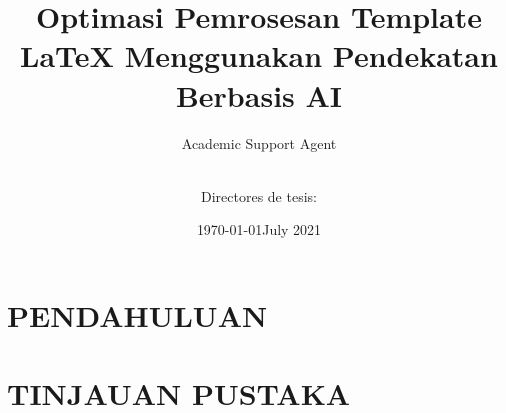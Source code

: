 \documentclass{book}
\title{Optimasi Pemrosesan Template LaTeX Menggunakan Pendekatan Berbasis AI}
\author{Academic Support Agent}
\date{\today}
\begin{document}
\maketitle

\begin{abstract}

\end{abstract}

\chapter{PENDAHULUAN}


\chapter{TINJAUAN PUSTAKA}


\usepackage[utf8]{inputenc}
\usepackage[spanish]{babel}
\usepackage[width=16cm,height=21cm]{geometry}
\usepackage{fancyhdr}
\usepackage[square,numbers]{natbib}
\usepackage[nottoc,numbib]{tocbibind}
\pagestyle{fancy}
\setlength{\headheight}{20pt}
\linespread{1.1}
\fancyhead[E]{\thepage\hfill \textit{\nouppercase{\rightmark}}}
\fancyhead[O]{\textit{\nouppercase{\leftmark}}\hfill\thepage}
\renewcommand{\headrulewidth}{0.5pt}
\cfoot{}
\usepackage{amsmath,amssymb,mathtools}
\usepackage{url}
\usepackage{tikz}
\usetikzlibrary{shapes.geometric}
\newcommand{\bD}{\mathbb{D}}
\newcommand{\bR}{\mathbb{R}}
\newcommand{\bZ}{\mathbb{Z}}
\newcommand{\bC}{\mathbb{C}}
\newcommand{\bN}{\mathbb{N}}
\newcommand{\cH}{\mathcal{H}}
\newcommand{\cA}{\mathcal{A}}
\renewcommand{\phi}{\varphi}
\newcommand{\arctanh}{\operatorname{arctanh}}
\newcommand{\sinc}{\operatorname{sinc}}
\newcommand{\eqdef}{\coloneqq}
\newcommand{\eps}{\varepsilon}
\newcommand{\de}{\delta}
\usepackage{amsthm}
\newtheorem{thm}{Teorema}
\newtheorem{prop}[thm]{Proposición}
\newtheorem{lem}[thm]{Lema}
\newtheorem{conj}[thm]{Conjetura}
\theoremstyle{definition}
\newtheorem{defn}[thm]{Definición}
\newtheorem{cor}[thm]{Corolario}
\newtheorem{ex}[thm]{Ejemplo}



\usepackage{xcolor}
\newenvironment{egornote}{\color{blue}}{}

\title{ }
\author{ \\
[1cm]{Directores de tesis:
}}
\date{July 2021}
\end{document}
